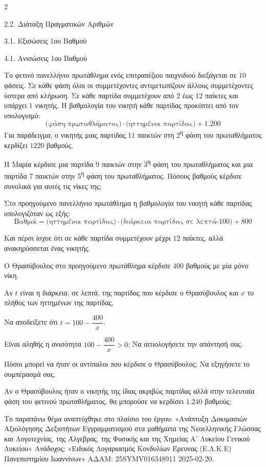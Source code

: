 \begin{ylh}{2}
    \item 2.2. Διάταξη Πραγματικών Αριθμών
    \item 3.1. Εξισώσεις 1ου Βαθμού
    \item 4.1. Ανισώσεις 1ου Βαθμού
\end{ylh}
Το φετινό πανελλήνιο πρωτάθλημα ενός επιτραπέζιου παιχνιδιού διεξάγεται σε $10$ φάσεις. Σε κάθε φάση όλοι οι συμμετέχοντες αντιμετωπίζουν άλλους συμμετέχοντες ύστερα από κλήρωση. Σε κάθε παρτίδα συμμετέχουν από $2$ έως $12$ παίκτες και υπάρχει $1$ νικητής. Η βαθμολογία του νικητή κάθε παρτίδας προκύπτει από τον υπολογισμό:
\[\text{(φάση πρωταθλήματος)}\cdot\text{(ηττημένοι παρτίδας)}+1.200\]
Για παράδειγμα, ο νικητής μιας παρτίδας $11$ παικτών στη 2\textsuperscript{η} φάση του πρωταθλήματος κερδίζει $1220$ βαθμούς.
\begin{alist}
\item Η Μαρία κέρδισε μια παρτίδα 9 παικτών στην 3\textsuperscript{η} φάση του πρωταθλήματος και μια παρτίδα 7 παικτών στην 5\textsuperscript{η} φάση του πρωταθλήματος. Πόσους βαθμούς κέρδισε συνολικά για αυτές τις νίκες της;
\item Στο προηγούμενο πανελλήνιο πρωτάθλημα η βαθμολογία του νικητή κάθε παρτίδας υπολογιζόταν ως εξής:
\[\text{Βαθμοί}=\text{(ηττημένοι παρτίδας)}\cdot\text{(διάρκεια παρτίδας σε λεπτά-100)}+800\]

Και πέρσι ίσχυε ότι σε κάθε παρτίδα συμμετέχουν μέχρι $12$ παίκτες, αλλά ανακηρύσσεται ένας νικητής.

Ο Θρασύβουλος στο προηγούμενο πρωτάθλημα κέρδισε $400$ βαθμούς με μία μόνο νίκη.

Αν $t$ είναι η διάρκεια, σε λεπτά, της παρτίδας που κέρδισε ο Θρασύβουλος και $x$ το πλήθος των ηττημένων της παρτίδας,

\begin{rlist}
\item Να αποδείξετε ότι $t = 100 - \dfrac{400}{x}$.
\item Είναι αληθής η ανισότητα $100 - \dfrac{400}{x} > 0$; Να αιτιολογήσετε την απάντησή σας.
\item Πόσοι μπορεί να ήταν οι αντίπαλοι που κέρδισε ο Θρασύβουλος; Να εξηγήσετε το συμπέρασμά σας.
\item Αν ο Θρασύβουλος ήταν ο νικητής της ίδιας ακριβώς παρτίδας αλλά στην τελευταία φάση του φετινού πρωταθλήματος, θα μπορούσε να κερδίσει $1.240$ βαθμούς;
\end{rlist}
\end{alist}
{\footnotesize Το παραπάνω θέμα αναπτύχθηκε στο πλαίσιο του έργου: «Ανάπτυξη Δοκιμασιών Αξιολόγησης Δεξιοτήτων Εγγραμματισμού στα μαθήματα της Νεοελληνικής Γλώσσας και Λογοτεχνίας, της Άλγεβρας, της Φυσικής και της Χημείας Α' Λυκείου Γενικού Λυκείου» Ανάδοχος: «Ειδικός Λογαριασμός Κονδυλίων Έρευνας (Ε.Λ.Κ.Ε) Πανεπιστημίου Ιωαννίνων» ΑΔΑΜ: 25SYMV016348911 2025-02-20.}


